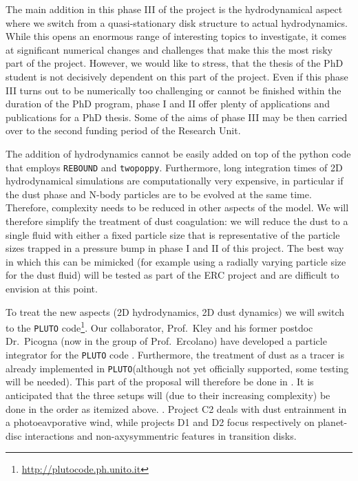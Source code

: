 \documentclass[10pt,fleqn,twoside]{article}
\newcommand{\twopoppy}{\texttt{twopoppy}\xspace}
\newcommand{\rebound}{\texttt{REBOUND}\xspace}
\newcommand{\pluto}{\texttt{PLUTO}\xspace}
\begin{document}
The main addition in this phase III of the project is the
hydrodynamical aspect where we switch from a quasi-stationary disk
structure to actual hydrodynamics. While this opens an enormous range
of interesting topics to investigate, it comes at significant
numerical changes and challenges that make this the most risky part of
the project. However, we would like to stress, that the thesis of the
PhD student is not decisively dependent on this part of the project.
Even if this phase III turns out to be numerically too challenging or
cannot be finished within the duration of the PhD program, phase I and
II offer plenty of applications and publications for a PhD
thesis. Some of the aims of phase III may be then carried over
to the second funding period of the Research Unit. 

The addition of hydrodynamics cannot be easily added on top of the
python code that employs \rebound and \twopoppy. Furthermore, long
integration times of 2D hydrodynamical simulations are computationally
very expensive, in particular if the dust phase and N-body particles
are to be evolved at the same time. Therefore, complexity needs to be
reduced in other aspects of the model. We will therefore simplify the
treatment of dust coagulation: we will reduce the dust to a single
fluid with either a fixed particle size that is representative of the
particle sizes trapped in a pressure bump in phase I and II of this
project. The best way in which this can be mimicked (for example using
a radially varying particle size for the dust fluid) will be tested as
part of the ERC project and are difficult to envision at this point.

To treat the new aspects (2D hydrodynamics, 2D dust dynamics) we will
switch to the \pluto
code\footnote{\url{http://plutocode.ph.unito.it}}. Our collaborator,
Prof.~Kley and his former postdoc Dr.\ Picogna (now in the group of
Prof.~Ercolano) have developed a particle integrator for the \pluto
code \citep[see][]{2015A&A...584A.110P}. Furthermore, the treatment of
dust as a tracer is already implemented in \pluto (although not yet
officially supported, some testing will be needed). This part of the
proposal will therefore be done in . It is
anticipated that the three setups will (due to their increasing
complexity) be done in the order as itemized above. . Project C2 deals with dust entrainment in a
photoeavporative wind, while projects D1 and D2 focus respectively on
planet-disc interactions and non-axysymmentric features in transition
disks. 
\end{document}
